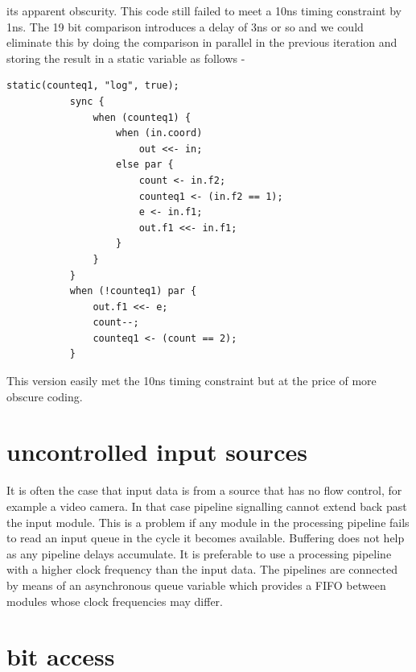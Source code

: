         its apparent obscurity. This code still failed to meet a 10ns timing
        constraint by 1ns. The 19 bit comparison introduces a delay of 3ns or
        so and we could eliminate this by doing the comparison in parallel in
        the previous iteration and storing the result in a static variable
        as follows -
        \begin{lstlisting}[gobble=8, language=threepl]
           static(counteq1, "log", true);
           sync {
               when (counteq1) {
                   when (in.coord)
                       out <<- in;
                   else par {
                       count <- in.f2;
                       counteq1 <- (in.f2 == 1);
                       e <- in.f1;
                       out.f1 <<- in.f1;
                   }
               }
           }
           when (!counteq1) par {
               out.f1 <<- e;
               count--;
               counteq1 <- (count == 2);
           }
        \end{lstlisting}
        This version easily met the 10ns timing constraint but at the price
        of more obscure coding.






    \section{uncontrolled input sources}
    
        It is often the case that input data is from a source that has no
        flow control, for example a video camera. In that case pipeline
        signalling cannot extend back past the input module. This is a
        problem if any module in the processing pipeline fails to read an
        input queue in the cycle it becomes available. Buffering does not help
        as any pipeline delays accumulate. It is preferable to use a
        processing pipeline with a higher clock frequency than the input
        data. The pipelines are connected by means of an asynchronous queue
        variable which provides a FIFO between modules whose clock
        frequencies may differ.

    \section{bit access}

